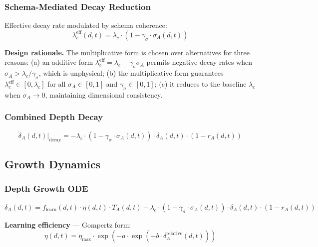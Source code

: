 \documentclass[11pt,a4paper]{article}
\begin{document}
\subsubsection{Schema-Mediated Decay Reduction}

Effective decay rate modulated by schema coherence:
\begin{equation}\label{eq:effective-decay}
\lambda_c^{\text{eff}}(d,t) = \lambda_c \cdot (1 - \gamma_\sigma \cdot \sigma_A(d,t))
\end{equation}

\textbf{Design rationale.} The multiplicative form is chosen over alternatives
for three reasons: (a) an additive form $\lambda_c^{\text{eff}} = \lambda_c - \gamma_\sigma \sigma_A$
permits negative decay rates when $\sigma_A > \lambda_c / \gamma_\sigma$, which is
unphysical; (b) the multiplicative form guarantees $\lambda_c^{\text{eff}} \in [0, \lambda_c]$
for all $\sigma_A \in [0,1]$ and $\gamma_\sigma \in [0,1]$; (c) it reduces to the
baseline $\lambda_c$ when $\sigma_A \to 0$, maintaining dimensional consistency.

\subsubsection{Combined Depth Decay}
\begin{equation}\label{eq:depth-decay}
\dot{\delta}_A(d,t)\big|_{\text{decay}} = -\lambda_c \cdot (1 - \gamma_\sigma \cdot \sigma_A(d,t)) \cdot \delta_A(d,t) \cdot (1 - r_A(d,t))
\end{equation}

\subsection{Growth Dynamics}\label{sec:growth}

\subsubsection{Depth Growth ODE}
\begin{equation}\label{eq:depth-ode}
\dot{\delta}_A(d,t) = f_{\text{learn}}(d,t) \cdot \eta(d,t) \cdot T_A(d,t) - \lambda_c \cdot (1 - \gamma_\sigma \cdot \sigma_A(d,t)) \cdot \delta_A(d,t) \cdot (1 - r_A(d,t))
\end{equation}

\textbf{Learning efficiency} --- Gompertz form:
\begin{equation}\label{eq:gompertz}
\eta(d,t) = \eta_{\text{max}} \cdot \exp(-a \cdot \exp(-b \cdot \delta_A^{\text{relative}}(d,t)))
\end{equation}
\end{document}
